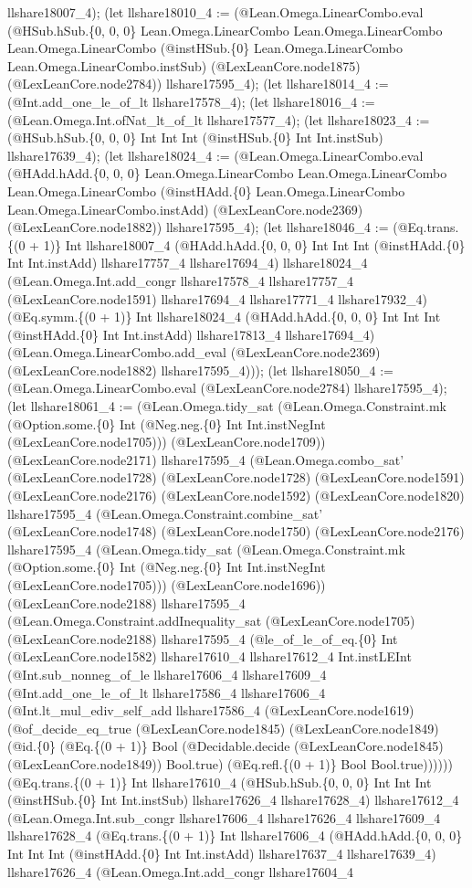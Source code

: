 \documentclass[11pt]{article}
\begin{document}
llshare18007\_4); (let llshare18010\_4 := (@Lean.Omega.LinearCombo.eval (@HSub.hSub.\{0, 0, 0\} Lean.Omega.LinearCombo Lean.Omega.LinearCombo Lean.Omega.LinearCombo (@instHSub.\{0\} Lean.Omega.LinearCombo Lean.Omega.LinearCombo.instSub) (@LexLeanCore.node1875) (@LexLeanCore.node2784)) llshare17595\_4); (let llshare18014\_4 := (@Int.add\_one\_le\_of\_lt llshare17578\_4); (let llshare18016\_4 := (@Lean.Omega.Int.ofNat\_lt\_of\_lt llshare17577\_4); (let llshare18023\_4 := (@HSub.hSub.\{0, 0, 0\} Int Int Int (@instHSub.\{0\} Int Int.instSub) llshare17639\_4); (let llshare18024\_4 := (@Lean.Omega.LinearCombo.eval (@HAdd.hAdd.\{0, 0, 0\} Lean.Omega.LinearCombo Lean.Omega.LinearCombo Lean.Omega.LinearCombo (@instHAdd.\{0\} Lean.Omega.LinearCombo Lean.Omega.LinearCombo.instAdd) (@LexLeanCore.node2369) (@LexLeanCore.node1882)) llshare17595\_4); (let llshare18046\_4 := (@Eq.trans.\{(0 + 1)\} Int llshare18007\_4 (@HAdd.hAdd.\{0, 0, 0\} Int Int Int (@instHAdd.\{0\} Int Int.instAdd) llshare17757\_4 llshare17694\_4) llshare18024\_4 (@Lean.Omega.Int.add\_congr llshare17578\_4 llshare17757\_4 (@LexLeanCore.node1591) llshare17694\_4 llshare17771\_4 llshare17932\_4) (@Eq.symm.\{(0 + 1)\} Int llshare18024\_4 (@HAdd.hAdd.\{0, 0, 0\} Int Int Int (@instHAdd.\{0\} Int Int.instAdd) llshare17813\_4 llshare17694\_4) (@Lean.Omega.LinearCombo.add\_eval (@LexLeanCore.node2369) (@LexLeanCore.node1882) llshare17595\_4))); (let llshare18050\_4 := (@Lean.Omega.LinearCombo.eval (@LexLeanCore.node2784) llshare17595\_4); (let llshare18061\_4 := (@Lean.Omega.tidy\_sat (@Lean.Omega.Constraint.mk (@Option.some.\{0\} Int (@Neg.neg.\{0\} Int Int.instNegInt (@LexLeanCore.node1705))) (@LexLeanCore.node1709)) (@LexLeanCore.node2171) llshare17595\_4 (@Lean.Omega.combo\_sat' (@LexLeanCore.node1728) (@LexLeanCore.node1728) (@LexLeanCore.node1591) (@LexLeanCore.node2176) (@LexLeanCore.node1592) (@LexLeanCore.node1820) llshare17595\_4 (@Lean.Omega.Constraint.combine\_sat' (@LexLeanCore.node1748) (@LexLeanCore.node1750) (@LexLeanCore.node2176) llshare17595\_4 (@Lean.Omega.tidy\_sat (@Lean.Omega.Constraint.mk (@Option.some.\{0\} Int (@Neg.neg.\{0\} Int Int.instNegInt (@LexLeanCore.node1705))) (@LexLeanCore.node1696)) (@LexLeanCore.node2188) llshare17595\_4 (@Lean.Omega.Constraint.addInequality\_sat (@LexLeanCore.node1705) (@LexLeanCore.node2188) llshare17595\_4 (@le\_of\_le\_of\_eq.\{0\} Int (@LexLeanCore.node1582) llshare17610\_4 llshare17612\_4 Int.instLEInt (@Int.sub\_nonneg\_of\_le llshare17606\_4 llshare17609\_4 (@Int.add\_one\_le\_of\_lt llshare17586\_4 llshare17606\_4 (@Int.lt\_mul\_ediv\_self\_add llshare17586\_4 (@LexLeanCore.node1619) (@of\_decide\_eq\_true (@LexLeanCore.node1845) (@LexLeanCore.node1849) (@id.\{0\} (@Eq.\{(0 + 1)\} Bool (@Decidable.decide (@LexLeanCore.node1845) (@LexLeanCore.node1849)) Bool.true) (@Eq.refl.\{(0 + 1)\} Bool Bool.true)))))) (@Eq.trans.\{(0 + 1)\} Int llshare17610\_4 (@HSub.hSub.\{0, 0, 0\} Int Int Int (@instHSub.\{0\} Int Int.instSub) llshare17626\_4 llshare17628\_4) llshare17612\_4 (@Lean.Omega.Int.sub\_congr llshare17606\_4 llshare17626\_4 llshare17609\_4 llshare17628\_4 (@Eq.trans.\{(0 + 1)\} Int llshare17606\_4 (@HAdd.hAdd.\{0, 0, 0\} Int Int Int (@instHAdd.\{0\} Int Int.instAdd) llshare17637\_4 llshare17639\_4) llshare17626\_4 (@Lean.Omega.Int.add\_congr llshare17604\_4 
\end{document}
